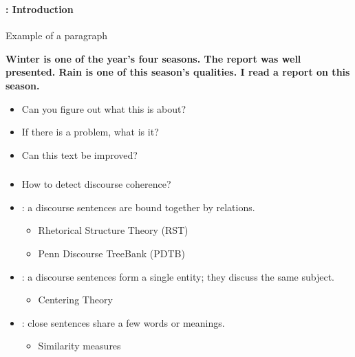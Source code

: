 \documentclass[xcolor=table]{beamer}
\subtitle[10- Discourse coherence]{Chapter 10\\Discourse coherence}
\begin{document}
	
\begin{frame}
	\frametitle{\inserttitle}
	\framesubtitle{\insertshortsubtitle: Introduction}

	\begin{exampleblock}{Example of a paragraph}
		\begin{center}
			\Large\bfseries
			Winter is one of the year's four seasons.
			The report was well presented.
			Rain is one of this season's qualities.
			I read a report on this season.
		\end{center}
	\end{exampleblock}
	
	\begin{itemize}
		\item Can you figure out what this is about?
		\item If there is a problem, what is it?
		\item Can this text be improved?
	\end{itemize}

\end{frame}

\begin{frame}
	\frametitle{\inserttitle}
	\framesubtitle{\insertshortsubtitle}
	
	\begin{itemize}
		\item How to detect discourse coherence?
		\item {}: a discourse sentences are bound together by relations. 
		\begin{itemize}
			\item Rhetorical Structure Theory (RST) 
			\item Penn Discourse TreeBank (PDTB)
		\end{itemize}
		\item {}: a discourse sentences form a single entity; they discuss the same subject.
		\begin{itemize}
			\item Centering Theory 
		\end{itemize}
		\item {}: close sentences share a few words or meanings.
		\begin{itemize}
			\item Similarity measures
		\end{itemize}
	\end{itemize}
	
\end{frame}
\end{document}
